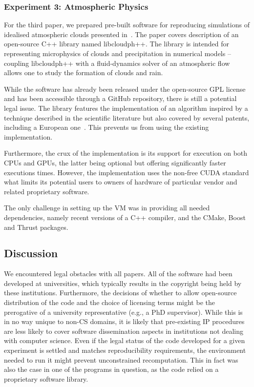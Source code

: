 \subsubsection*{Experiment 3: Atmospheric Physics}

For the third paper, we prepared pre-built software for reproducing 
  simulations of idealised atmospheric clouds presented in~\cite{arabas2013libcloud}.
The paper covers description of an open-source C++ library named libcloudph++. 
The library is intended for representing microphysics of clouds and precipitation
  in numerical models -- coupling libcloudph++ with a fluid-dynamics solver 
  of an atmospheric flow allows one to study the formation of clouds and rain.

While the software has already been released under the open-source GPL license
  and has been accessible through a GitHub repository, there is still
  a potential legal issue.
The library features the implementation of an algorithm inspired by a technique 
  described in the scientific literature but also covered by several patents,
  including a European one~\cite{shima2007simulation}. This prevents us from using the
  existing implementation.

Furthermore, the crux of the implementation is its support for execution
  on both CPUs and GPUs, the latter being optional but offering 
  significantly faster executions times.
However, the implementation uses the non-free CUDA standard what limits its potential
  users to owners of hardware of particular vendor and related proprietary software.

The only challenge in setting up the VM was in providing all needed
  dependencies, namely recent versions of a C++ compiler, and the CMake, Boost and Thrust 
  packages.

\subsection{Discussion}

We encountered legal obstacles with all papers.
All of the software had been developed at universities, which typically results in the copyright being held by these institutions.
Furthermore, the decisions of whether to allow open-source distribution of the
code and the choice of licensing terms might be the prerogative of a university
representative (e.g., a PhD supervisor).
While this is in no way unique to non-CS domains, it is likely that pre-existing IP procedures are less likely to cover software dissemination aspects in institutions not dealing with computer science.
Even if the legal status of the code developed for a given experiment is settled and matches reproducibility requirements, the environment needed to run it might prevent unconstrained recomputation.
This in fact was also the case in one of the programs in question, as the code relied on a proprietary software library.


